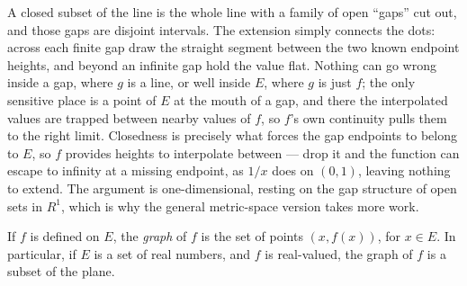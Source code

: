 \documentclass[main.tex]{subfiles}
\begin{document}
\begin{Reflection}
A closed subset of the line is the whole line with a family of open ``gaps'' cut out, and those gaps are disjoint intervals. The extension simply connects the dots: across each finite gap draw the straight segment between the two known endpoint heights, and beyond an infinite gap hold the value flat. Nothing can go wrong inside a gap, where $g$ is a line, or well inside $E$, where $g$ is just $f$; the only sensitive place is a point of $E$ at the mouth of a gap, and there the interpolated values are trapped between nearby values of $f$, so $f$'s own continuity pulls them to the right limit. Closedness is precisely what forces the gap endpoints to belong to $E$, so $f$ provides heights to interpolate between --- drop it and the function can escape to infinity at a missing endpoint, as $1/x$ does on $(0,1)$, leaving nothing to extend. The argument is one-dimensional, resting on the gap structure of open sets in $R^{1}$, which is why the general metric-space version takes more work.
\end{Reflection}

If $f$ is defined on $E$, the \textit{graph} of $f$ is the set of points $(x, f(x))$, for $x \in E$. In particular, if $E$ is a set of real numbers, and $f$ is real-valued, the graph of $f$ is a subset of the plane.
\end{document}
